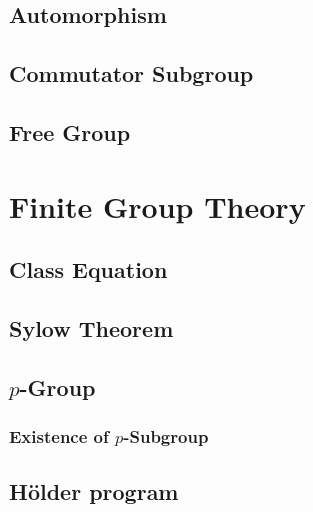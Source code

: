 \section{Automorphism}

\section{Commutator Subgroup}

\section{Free Group}

\chapter{Finite Group Theory}

\section{Class Equation}

\section{Sylow Theorem}

\section{$p$-Group}

\subsection{Existence of $p$-Subgroup}

\section{Hölder program}
